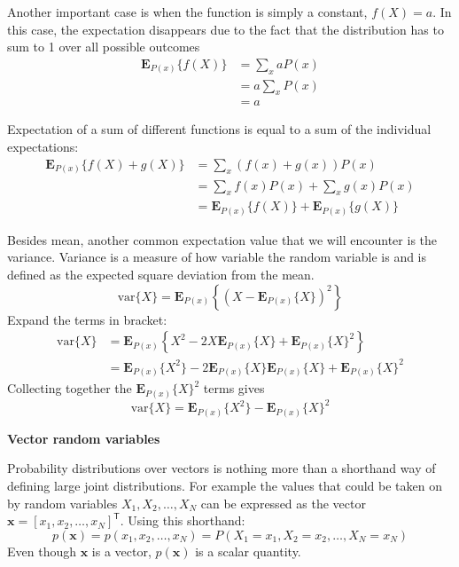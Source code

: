Another important case is when the function is simply a constant, $f(X)=a$.
In this case, the expectation
disappears due to the fact that the distribution has to sum to 1 over all possible outcomes
\begin{align*}
\mathbf{E}_{P(x)}\{f(X)\} & = \sum_{x} aP(x) \\
& = a \sum_{x} P(x) \\
& = a
\end{align*}

Expectation of a sum of different functions is equal to a sum of the individual expectations:
\begin{align*}
\mathbf{E}_{P(x)}\{ f(X) + g(X) \} & = \sum_{x} (f(x) + g(x)) P(x) \\
& = \sum_{x} f(x) P(x) + \sum_{x} g(x) P(x) \\
& = \mathbf{E}_{P(x)}\{ f(X) \} + \mathbf{E}_{P(x)}\{ g(X) \}
\end{align*}

Besides mean, another common expectation value that we will encounter is the variance.
Variance is a measure of how variable the random variable is and is defined as the expected
square deviation from the mean.
\begin{equation}
\mathrm{var}\{X\} = \mathbf{E}_{P(x)}\left\{ \left(X - \mathbf{E}_{P(x)}\{X\}\right)^2 \right\}
\end{equation}
Expand the terms in bracket:
\begin{align*}
\mathrm{var}\{X\} & = \mathbf{E}_{P(x)}\left\{
X^2 - 2X\mathbf{E}_{P(x)}\{X\} + \mathbf{E}_{P(x)}\{X\}^2
\right\} \\
& = \mathbf{E}_{P(x)}\{X^2\} - 2\mathbf{E}_{P(x)}\{X\}\mathbf{E}_{P(x)}\{X\} +
\mathbf{E}_{P(x)}\{X\}^2
\end{align*}
Collecting together the $\mathbf{E}_{P(x)}\{X\}^2$ terms gives
\begin{equation}
\mathrm{var}\{X\} = \mathbf{E}_{P(x)}\{X^2\} - \mathbf{E}_{P(x)}\{X\}^2
\end{equation}

\textbf{Vector random variables}

Probability distributions over vectors is nothing more than a shorthand way of defining
large joint distributions. For example the values that could be taken on by random variables
$X_{1}, X_{2}, \ldots, X_{N}$ can be expressed as the vector
$\mathbf{x} = [x_{1}, x_{2}, \ldots, x_{N}]^{\mathsf{T}}$. Using this shorthand:
\begin{equation}
p(\mathbf{x}) = p(x_1,x_2,\ldots,x_N) = P(X_1=x_1, X_2=x_2, \ldots, X_N=x_N)
\end{equation}
Even though $\mathbf{x}$ is a vector, $p(\mathbf{x})$ is a scalar quantity.

